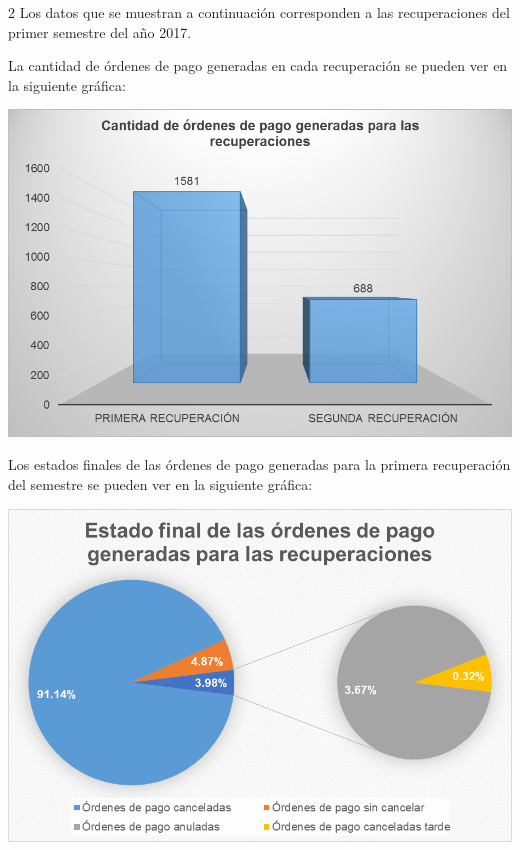 \documentclass[12pt,spanish,Letterpaper,openany]{book}
\newcommand{\spacethreemilis}{\vspace{3mm}}
\begin{document}
\begin {multicols}{2}
Los datos que se muestran a continuación corresponden a las recuperaciones del primer semestre del año 2017.

La cantidad de órdenes de pago generadas en cada recuperación se pueden ver en la siguiente gráfica:

\begin {flushleft}
\noindent\begin{minipage}[c]{\columnwidth}

\includegraphics[width=1\linewidth]{images/image05_rherrera}

\end{minipage}

\end {flushleft}

\spacethreemilis

Los estados finales de las órdenes de pago generadas para la primera recuperación del semestre se pueden ver en la siguiente gráfica:

\begin {flushleft}
\noindent\begin{minipage}[c]{\columnwidth}

\includegraphics[width=1\linewidth]{images/image06_rherrera}


\end{minipage}
\end{flushleft}
\end{multicols}
\end{document}
